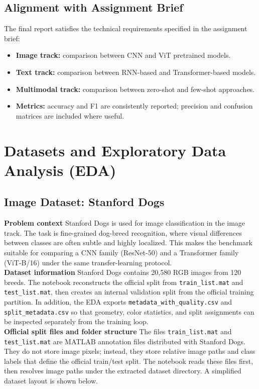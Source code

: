 \documentclass[twoside,final]{hcmut-report}
\begin{document}
\subsection{Alignment with Assignment Brief}
The final report satisfies the technical requirements specified in the assignment brief:
\begin{itemize}[leftmargin=*, nosep]
    \item \textbf{Image track:} comparison between CNN and ViT pretrained models.
    \item \textbf{Text track:} comparison between RNN-based and Transformer-based models.
    \item \textbf{Multimodal track:} comparison between zero-shot and few-shot approaches.
    \item \textbf{Metrics:} accuracy and F1 are consistently reported; precision and confusion matrices are included where useful.
\end{itemize}

\section{Datasets and Exploratory Data Analysis (EDA)}

\subsection{Image Dataset: Stanford Dogs}
\noindent \textbf{Problem context} Stanford Dogs is used for image classification in the image track. The task is fine-grained dog-breed recognition, where visual differences between classes are often subtle and highly localized. This makes the benchmark suitable for comparing a CNN family (ResNet-50) and a Transformer family (ViT-B/16) under the same transfer-learning protocol.\\

\noindent \textbf{Dataset information} Stanford Dogs contains 20,580 RGB images from 120 breeds. The notebook reconstructs the official split from \texttt{train\_list.mat} and \texttt{test\_list.mat}, then creates an internal validation split from the official training partition. In addition, the EDA exports \texttt{metadata\_with\_quality.csv} and \texttt{split\_metadata.csv} so that geometry, color statistics, and split assignments can be inspected separately from the training loop.\\

\noindent \textbf{Official split files and folder structure} The files \texttt{train\_list.mat} and \texttt{test\_list.mat} are MATLAB annotation files distributed with Stanford Dogs. They do not store image pixels; instead, they store relative image paths and class labels that define the official train/test split. The notebook reads these files first, then resolves image paths under the extracted dataset directory. A simplified dataset layout is shown below.
\end{document}
